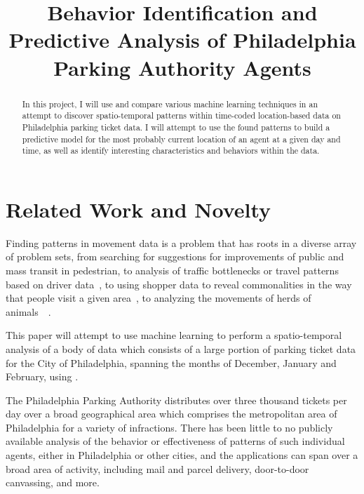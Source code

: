 \documentclass[conference]{IEEEtran}
\begin{document}
\title{Behavior Identification and Predictive Analysis of Philadelphia Parking Authority Agents}

\author{
}

\maketitle

\begin{abstract}
In this project, I will use and compare various machine learning techniques in
an attempt to discover spatio-temporal patterns within time-coded location-based
data on Philadelphia parking ticket data. I will attempt to use the found
patterns to build a predictive model for the most probably current location of
an agent at a given day and time, as well as identify interesting
characteristics and behaviors within the data.

\end{abstract}

\section{Related Work and Novelty}
\label{sec:intro}
Finding patterns in movement data is a problem that has roots in a diverse array
of problem sets, from searching for suggestions for improvements of public and
mass transit in pedestrian, to analysis of traffic bottlenecks or travel
patterns based on driver data~\cite{holyoakAUS}, to using shopper data to reveal
commonalities in the way that people visit a given area~\cite{Orellana2012672},
to analyzing the movements of herds of animals~\cite{zebranet}~\cite{animaleda}.

This paper will attempt to use machine learning to perform a spatio-temporal
analysis of a body of data which consists of a large portion of parking ticket
data for the City of Philadelphia, spanning the months of December, January and
February, using .

The Philadelphia Parking Authority distributes over three thousand tickets per
day over a broad geographical area which comprises the metropolitan area of
Philadelphia for a variety of infractions. There has been little to no
publicly available analysis of the behavior or effectiveness of patterns of
such individual agents, either in Philadelphia or other cities, and the
applications can span over a broad area of activity, including mail and parcel
delivery, door-to-door canvassing, and more.
\end{document}
